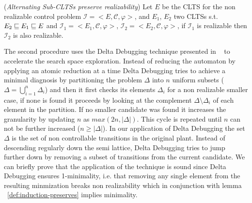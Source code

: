 \begin{lemma}\label{def:induction-preserves}(\emph{Alternating Sub-CLTSs preserve realizability})
Let $E$ be the CLTS for the non realizable control problem
$\mathcal{I}=<E,\mathcal{C}, \varphi>$, and $E_1$, $E_2$ two CLTSs s.t. 
$E_2 \sqsubseteq E_1 \sqsubseteq E$ and
$\mathcal{I}_1=<E_1, \mathcal{C}, \varphi>$, $\mathcal{I}_2=<E_2, \mathcal{C}, \varphi>$, if $\mathcal{I}_1$ is realizable then $\mathcal{I}_2$ is also realizable.
\end{lemma}


The second procedure uses the Delta Debugging technique presented in ~\cite{DBLP:journals/tse/ZellerH02} to accelerate the search space exploration. Instead of reducing the automaton by applying an atomic reduction at a time Delta Debugging tries to achieve a minimal diagnosis by partitioning the problem $\Delta$ into $n$ uniform subsets ($\Delta = \bigcup_{i=1}^n \Delta_i $) and then it first checks its elements $\Delta_i$ for a non realizable smaller case, if none is found it proceeds by looking at the complement $\Delta \setminus \Delta_i$ of each element in the partition. If no smaller candidate was found it increases the granularity by updating $n$ as $max(2n,|\Delta|)$. This cycle is repeated until $n$ can not be further increased ($n \geq |\Delta|$). 
In our application of Delta Debugging the set $\Delta$ is the set of non controllable transitions in the original plant. Instead of descending regularly down the semi lattice, Delta Debugging tries to jump further down by removing a subset of transitions from the current candidate. We can briefly prove that the application of the technique is sound since Delta Debugging ensures 1-minimality, i.e. that removing any single element from the resulting minmization breaks non realizability which in conjunction with lemma ~\ref{def:induction-preserves} implies minimality.

